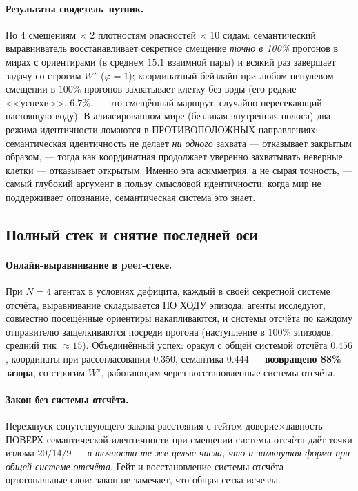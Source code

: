 \documentclass{article}
\newcommand{\wstar}{W^{\star}}
\begin{document}
\paragraph{Результаты свидетель--путник.} По 4 смещениям $\times$ 2
плотностям опасностей $\times$ 10 сидам: семантический выравниватель
восстанавливает секретное смещение \emph{точно в 100\%} прогонов в
мирах с ориентирами (в среднем $15.1$ взаимной пары) и всякий раз
завершает задачу со строгим $\wstar$ ($\varphi{=}1$); координатный
бейзлайн при любом ненулевом смещении в $100\%$ прогонов захватывает
клетку без воды (его редкие <<успехи>>, $6.7\%$, --- это смещённый
маршрут, случайно пересекающий настоящую воду). В алиасированном мире
(безликая внутренняя полоса) два режима идентичности ломаются в
ПРОТИВОПОЛОЖНЫХ направлениях: семантическая идентичность не делает
\emph{ни одного} захвата --- отказывает закрытым образом, --- тогда
как координатная продолжает уверенно захватывать неверные клетки ---
отказывает открытым. Именно эта асимметрия, а не сырая точность, ---
самый глубокий аргумент в пользу смысловой идентичности: когда мир не
поддерживает опознание, семантическая система это знает.

\subsection{Полный стек и снятие последней оси}
\label{p3:sec:stack}

\paragraph{Онлайн-выравнивание в peer-стеке.} При $N{=}4$ агентах в
условиях дефицита, каждый в своей секретной системе отсчёта,
выравнивание складывается ПО ХОДУ эпизода: агенты исследуют, совместно
посещённые ориентиры накапливаются, и системы отсчёта по каждому
отправителю защёлкиваются посреди прогона (наступление в $100\%$
эпизодов, средний тик ${\approx}15$). Объединённый успех: оракул с
общей системой отсчёта $0.456$, координаты при рассогласовании
$0.350$, семантика $0.444$ --- \textbf{возвращено 88\% зазора}, со
строгим $\wstar$, работающим через восстановленные системы отсчёта.

\paragraph{Закон без системы отсчёта.} Перезапуск сопутствующего
закона расстояния с гейтом доверие$\times$давность ПОВЕРХ
семантической идентичности при смещении системы отсчёта даёт точки
излома $20/14/9$ --- \emph{в точности те же целые числа, что и
замкнутая форма при общей системе отсчёта}. Гейт и восстановление
системы отсчёта --- ортогональные слои: закон не замечает, что общая
сетка исчезла.
\end{document}
